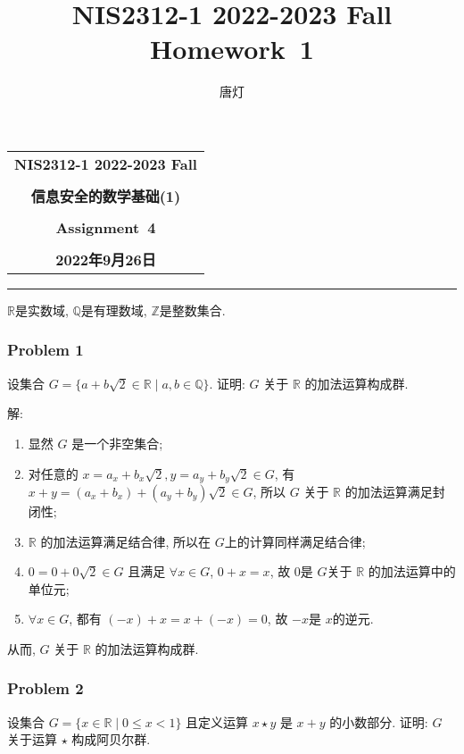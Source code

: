 \documentclass[a4paper,12pt]{ctexart}
\title{NIS2312-1 2022-2023 Fall Homework~1}
\author{唐灯}
\newcommand{\Z}{\mathbb{Z}}
\newcommand{\Q}{\mathbb{Q}}
\newcommand{\R}{\mathbb{R}}
\begin{document}
  \begin{center}

  \vspace{-0.3in}
  \begin{tabular}{c}
    \textbf{\Large NIS2312-1 2022-2023 Fall} \\
    \textbf{\Large  } \\
    \textbf{\Large  信息安全的数学基础(1)} \\
    \textbf{\Large  } \\
    \textbf{\Large  Assignment~4} \\
    \textbf{\Large  } \\
    \textbf{\Large 2022年9月26日} \\
  \end{tabular}
  \end{center}
  \noindent
  \rule{\linewidth}{0.4pt}
  
$ \R $是实数域, $ \Q $是有理数域, $ \Z $是整数集合.

\subsubsection*{Problem 1}
    设集合 $ G = \{a+b\sqrt{2}\in\R\mid a,b\in\Q\} $. 证明: $ G $ 关于 $ \R $ 的加法运算构成群.

    解: 
    \begin{enumerate}[label=(\arabic*)]
      \item 显然 $ G $ 是一个非空集合; 
      \item 对任意的 $ x=a_x+b_x\sqrt{2}, y=a_y+b_y\sqrt{2} \in G $, 有 $ x+y=(a_x+b_x)+(a_y+b_y)\sqrt{2}\in G $, 所以 $ G $ 关于 $ \R $ 的加法运算满足封闭性;
      \item $ \R $ 的加法运算满足结合律, 所以在 $ G $上的计算同样满足结合律;
      \item $ 0=0+0\sqrt{2}\in G $ 且满足 $ \forall x\in G $, $ 0+x=x $, 
      故 $ 0 $是 $ G $关于 $ \R $ 的加法运算中的单位元;
      \item $ \forall x\in G $, 都有 $ (-x)+x=x+(-x)=0 $, 故 $ -x $是 $ x $的逆元.
    \end{enumerate}
    从而, $ G $ 关于 $ \R $ 的加法运算构成群.
      
\subsubsection*{Problem 2} 
    设集合 $ G = \{x \in\R \mid 0 \le x < 1\} $ 且定义运算 $ x \star y $ 是 $ x + y $ 的小数部分. 
    证明: $ G $ 关于运算 $ \star $ 构成阿贝尔群.
\end{document}
